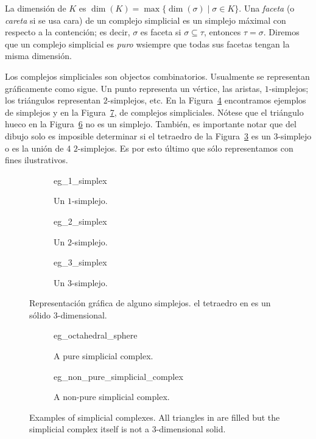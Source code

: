 \documentclass{standalone}
\begin{document}
	La dimensión de $K$ es $\dim(K)=\max\{\dim(\sigma)\mid\sigma\in K\}$. Una \emph{faceta} (o \emph{careta} si se usa cara) de un complejo simplicial es un simplejo máximal con respecto a la contención; es decir, $\sigma$ es faceta si $\sigma\subseteq\tau$, entonces $\tau=\sigma$. Diremos que un complejo simplicial es \emph{puro} wsiempre que todas sus facetas tengan la misma dimensión.
	
	Los complejos simpliciales son objectos combinatorios. Usualmente se representan gráficamente como sigue. Un punto representa un vértice, las aristas,  $1$-simplejos; los triángulos representan $2$-simplejos, etc. En la Figura~\ref{fig:eg_simplex} encontramos ejemplos de simplejos y en la Figura~\ref{fig:eg_simplicial_complex}, de complejos simpliciales. Nótese que el triángulo hueco en la Figura~\ref{fig:eg_non_pure} no es un simplejo. También, es importante notar que del dibujo solo es imposible determinar si el tetraedro de la Figura~\ref{fig:3_simplex} es un $3$-simplejo o es la unión de 4 $2$-simplejos. Es por esto último que sólo representamos con fines ilustrativos.
	
	\begin{figure}[h]
		\centering
		\begin{subfigure}{.3\textwidth}
			\centering
			{eg_1_simplex}
			\caption{Un $1$-simplejo.}
			\label{fig:1_simplex}
		\end{subfigure}
		\begin{subfigure}{.3\textwidth}
			\centering
			{eg_2_simplex}
			\caption{Un $2$-simplejo.}
			\label{fig:2_simplex}
		\end{subfigure}
		\begin{subfigure}{.3\textwidth}
			\centering
			{eg_3_simplex}
			\caption{Un $3$-simplejo.}
			\label{fig:3_simplex}
		\end{subfigure}
		\caption{Representación gráfica de alguno simplejos. el tetraedro en  es un sólido $3$-dimensional.}
		\label{fig:eg_simplex}
	\end{figure}
	\begin{figure}[h]
		\centering
		\begin{subfigure}{.4\textwidth}
			\centering
			{eg_octahedral_sphere}
			\caption{A pure simplicial complex.}
			\label{fig:eg_octahedral_sphere}
		\end{subfigure}
		\begin{subfigure}{.4\textwidth}
			\centering
			{eg_non_pure_simplicial_complex}
			\caption{A non-pure simplicial complex.}
			\label{fig:eg_non_pure}
		\end{subfigure}
		\caption{Examples of simplicial complexes. All triangles in  are filled but the simplicial complex itself is not a $3$-dimensional solid.}
		\label{fig:eg_simplicial_complex}
	\end{figure}
	
\end{document}

